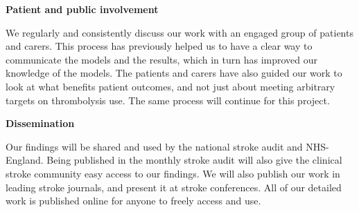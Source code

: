 \textbf{Patient and public involvement}

We regularly and consistently discuss our work with an engaged group of patients and carers. This process has previously helped us to have a clear way to communicate the models and the results, which in turn has improved our knowledge of the models. The patients and carers have also guided our work to look at what benefits patient outcomes, and not just about meeting arbitrary targets on thrombolysis use. The same process will continue for this project.

\textbf{Dissemination}

Our findings will be shared and used by the national stroke audit and NHS-England. Being published in the monthly stroke audit will also give the clinical stroke community easy access to our findings. We will also publish our work in leading stroke journals, and present it at stroke conferences. All of our detailed work is published online for anyone to freely access and use.